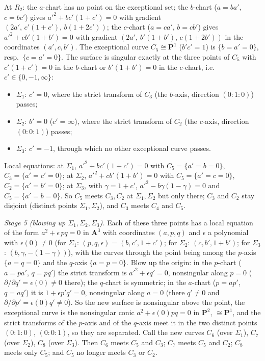 \documentclass[11pt]{article}
\begin{document}
At $R_2$: the $a$-chart has no point on the exceptional set; the $b$-chart ($a=ba'$, $c=bc'$) gives $a'^2+bc'(1+c')=0$ with gradient $(2a',\,c'(1+c'),\,b(1+2c'))$; the $c$-chart ($a=ca'$, $b=cb'$) gives $a'^2+cb'(1+b')=0$ with gradient $(2a',\,b'(1+b'),\,c(1+2b'))$ in the coordinates $(a',c,b')$. The exceptional curve $C_5\cong\mathbf P^1$ ($b'c'=1$) is $\{b=a'=0\}$, resp.\ $\{c=a'=0\}$. The surface is singular exactly at the three points of $C_5$ with $c'(1+c')=0$ in the $b$-chart or $b'(1+b')=0$ in the $c$-chart, i.e.\ $c'\in\{0,-1,\infty\}$:
\begin{itemize}
\item $\Sigma_1$: $c'=0$, where the strict transform of $C_3$ (the $b$-axis, direction $(0:1:0)$) passes;
\item $\Sigma_2$: $b'=0$ ($c'=\infty$), where the strict transform of $C_2$ (the $c$-axis, direction $(0:0:1)$) passes;
\item $\Sigma_3$: $c'=-1$, through which no other exceptional curve passes.
\end{itemize}
Local equations: at $\Sigma_1$, $a'^2+bc'(1+c')=0$ with $C_5=\{a'=b=0\}$, $C_3=\{a'=c'=0\}$; at $\Sigma_2$, $a'^2+cb'(1+b')=0$ with $C_5=\{a'=c=0\}$, $C_2=\{a'=b'=0\}$; at $\Sigma_3$, with $\gamma=1+c'$, $a'^2-b\gamma(1-\gamma)=0$ and $C_5=\{a'=b=0\}$. So $C_5$ meets $C_3,C_2$ at $\Sigma_1,\Sigma_2$ but only there; $C_3$ and $C_2$ stay disjoint (distinct points $\Sigma_1,\Sigma_2$), and $C_3$ meets $C_4$ and $C_5$.

\emph{Stage 5 (blowing up $\Sigma_1,\Sigma_2,\Sigma_3$).} Each of these three points has a local equation of the form $a^2+\epsilon\,pq=0$ in $\mathbf A^3$ with coordinates $(a,p,q)$ and $\epsilon$ a polynomial with $\epsilon(0)\neq0$ (for $\Sigma_1$: $(p,q,\epsilon)=(b,c',1+c')$; for $\Sigma_2$: $(c,b',1+b')$; for $\Sigma_3$: $(b,\gamma,-(1-\gamma))$), with the curves through the point being among the $p$-axis $\{a=q=0\}$ and the $q$-axis $\{a=p=0\}$. Blow up the origin: in the $p$-chart ($a=pa'$, $q=pq'$) the strict transform is $a'^2+\epsilon q'=0$, nonsingular along $p=0$ ($\partial/\partial q'=\epsilon(0)\ne0$ there); the $q$-chart is symmetric; in the $a$-chart ($p=ap'$, $q=aq'$) it is $1+\epsilon p'q'=0$, nonsingular along $a=0$ (there $q'\ne0$ and $\partial/\partial p'=\epsilon(0)q'\neq0$). So the new surface is nonsingular above the point, the exceptional curve is the nonsingular conic $a^2+\epsilon(0)pq=0$ in $\mathbf P^2$, $\cong\mathbf P^1$, and the strict transforms of the $p$-axis and of the $q$-axis meet it in the two distinct points $(0:1:0)$, $(0:0:1)$, so they are separated. Call the new curves $C_6$ (over $\Sigma_1$), $C_7$ (over $\Sigma_2$), $C_8$ (over $\Sigma_3$). Then $C_6$ meets $C_5$ and $C_3$; $C_7$ meets $C_5$ and $C_2$; $C_8$ meets only $C_5$; and $C_5$ no longer meets $C_3$ or $C_2$.
\end{document}
